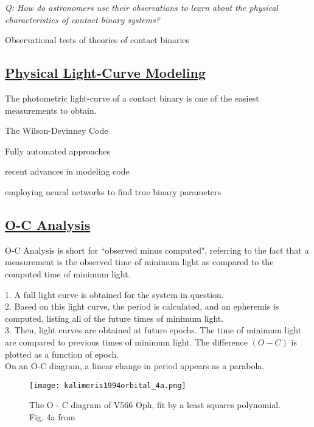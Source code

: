 \documentclass[12pt]{article} %
\numberwithin{equation}{section} %
\begin{document}
\emph{Q: How do astronomers use their observations to learn about the physical characteristics of contact binary systems?}

Observational tests of theories of contact binaries \citet{lucy1979observational}

\subsection[Physical Light-Curve Modeling]{\hyperlink{toc}{Physical Light-Curve Modeling}} \label{sec: Physical Light-Curve Modeling}

The photometric light-curve of a contact binary is one of the easiest measurements to obtain.

The Wilson-Devinney Code 

Fully automated approaches \citep{prsa2009fully} \citep{prsa2008artificial}

recent advances in modeling code \citep{prvsa2013physics}

employing neural networks to find true binary parameters \citep{zeraatgari2015neural}

\subsection[O-C Analysis]{\hyperlink{toc}{O-C Analysis}} \label{sec: O-C Analysis}

O-C Analysis is short for ``observed minus computed", referring to the fact that a measurement is the observed time of minimum light as compared to the computed time of minimum light. 

1. A full light curve is obtained for the system in question. \\
2. Based on this light curve, the period is calculated, and an epheremis is computed, listing all of the future times of minimum light. \\
3. Then, light curves are obtained at future epochs. The time of minimum light are compared to previous times of minimum light. The difference $(O-C)$ is plotted as a function of epoch. \\

On an O-C diagram, a linear change in period appears as a parabola.

\begin{figure}[H]
\centering
\texttt{[image: kalimeris1994orbital\_4a.png]}
\caption{ The O - C diagram of V566 Oph, fit by a least squares polynomial. Fig. 4a from \citet{kalimeris1994orbital}}
\label{fig: kalimeris1994orbital_4a}
\end{figure}
\end{document}
